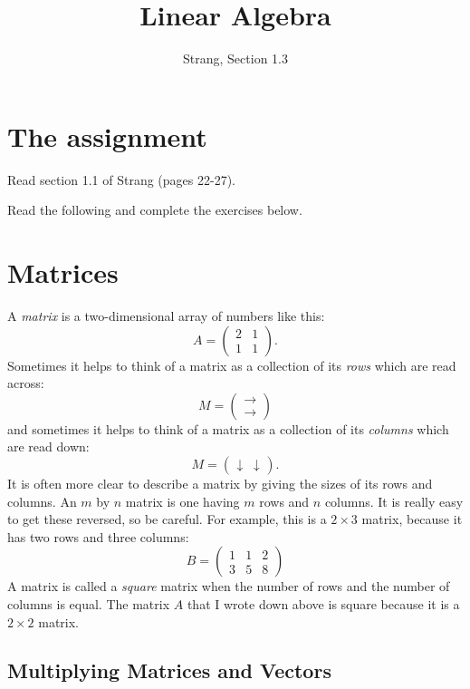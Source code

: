 \documentclass[11pt]{amsart}
\theoremstyle{definition}
\begin{document}
\title{Linear Algebra}
\author{Strang, Section 1.3}
\maketitle

\section{The assignment}
\begin{compactitem}
\item Read section 1.1 of Strang (pages 22-27).
\item Read the following and complete the exercises below.
\end{compactitem}

\section{Matrices}

A \emph{matrix} is a two-dimensional array of numbers like this:
\[
A = \begin{pmatrix} 2 & 1 \\ 1 & 1 \end{pmatrix}.
\]
Sometimes it helps to think of a matrix as a collection of its \emph{rows} which are read across:
\[
M = \begin{pmatrix} \longrightarrow \\ \longrightarrow \end{pmatrix}
\]
and sometimes it helps to think of a matrix as a collection of its \emph{columns} which are read down:
\[
M = \begin{pmatrix} \downarrow & \downarrow \end{pmatrix}.
\]
It is often more clear to describe a matrix by giving the sizes of its rows and columns. An $m$ by $n$ matrix is one having $m$ rows and $n$ columns. It is really easy to get these reversed, so be careful.
For example, this is a $2\times 3$ matrix, because it has two rows and three columns:
\[
B = \begin{pmatrix} 1 & 1 & 2 \\ 3 & 5 & 8 \end{pmatrix}
\]
A matrix is called a \emph{square} matrix when the number of rows and the number of columns is equal. The matrix $A$ that I wrote down above is square because it is a $2\times 2$ matrix.

\subsection{Multiplying Matrices and Vectors}
\end{document}
